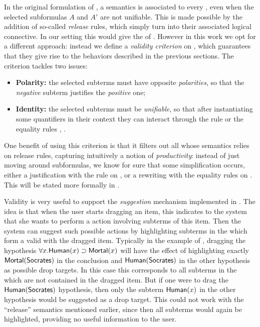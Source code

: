 In the original formulation of  , a
semantics is associated to every , even when the selected
subformulas $A$ and $A'$ are not unifiable. This is made possible by the
addition of so-called \emph{release} rules, which simply turn  into their
associated logical connective. In our setting this would give the 
of . However in this work we opt for a different approach:
instead we define a \emph{validity criterion} on , which guarantees that
they give rise to the behaviors described in the previous sections. The
criterion tackles two issues:
\begin{itemize}
  \item \textbf{Polarity:} the selected subterms must have opposite
  \emph{polarities}, so that the \emph{negative} subterm justifies the
  \emph{positive} one;
  \item \textbf{Identity:} the selected subterms must be \emph{unifiable}, so
  that after instantiating some quantifiers in their context they can interact
  through the {} rule or the equality rules {,
  }.
\end{itemize}
One benefit of using this criterion is that it filters out all  whose
semantics relies on release rules, capturing intuitively a notion of
\emph{productivity}: instead of just moving around subformulas, we know for sure
that some simplification occurs, either a justification with the {}
rule on , or a rewriting with the equality rules on . This will be stated more formally in .

Validity is very useful to support the \emph{suggestion} mechanism implemented
in . The idea is that when the user starts dragging an item, this
indicates to the system that she wants to perform a  action involving
subterms of this item. Then the system can suggest such possible actions by
highlighting subterms in the  which form a valid  with the dragged
item. Typically in the example of , dragging the hypothesis
$\forall x. \mbox{\textsf{Human}}(x) \supset \mbox{\textsf{Mortal}}(x)$ will have the effect of highlighting
exactly $\mbox{\textsf{Mortal}}(\mbox{\textsf{Socrates}})$ in the conclusion and $\mbox{\textsf{Human}}(\mbox{\textsf{Socrates}})$ in the
other hypothesis as possible drop targets. In this case this corresponds to all
subterms in the  which are not contained in the dragged item. But if one
were to drag the $\mbox{\textsf{Human}}(\mbox{\textsf{Socrates}})$ hypothesis, then only the subterm
$\mbox{\textsf{Human}}(x)$ in the other hypothesis would be suggested as a drop target. This
could not work with the ``release'' semantics mentioned earlier, since then all
subterms would again be highlighted, providing no useful information to the
user.

